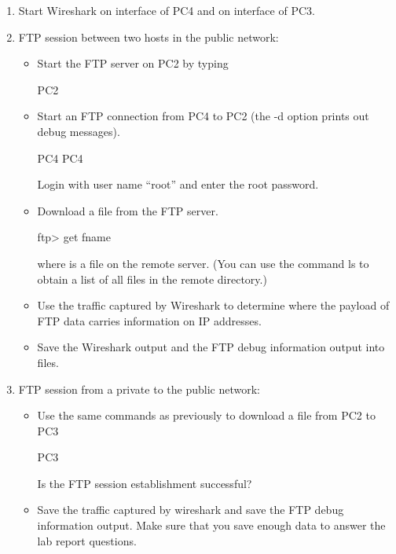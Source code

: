 \begin{enumerate}
	\item Start Wireshark on interface  of PC4 and on interface  of PC3.
	\item FTP session between two hosts in the public network:
		\begin {itemize}
			\item Start the FTP server on PC2 by typing
				\begin{cmdblock}
	PC2%
				\end{cmdblock}
			\item Start an FTP connection from PC4 to PC2 (the -d option prints out debug messages).
				\begin{cmdblock}
	PC4%
	PC4%
				\end{cmdblock}
				Login with user name ``root'' and enter the root password.
			\item Download a file from the FTP server.
				\begin{cmdblock}
	ftp> get fname
				\end{cmdblock}
				where  is a file on the remote server. (You can use the command ls to obtain a list of all files in the remote directory.)
			\item Use the traffic captured by Wireshark to determine where the payload of FTP data carries information on IP addresses.
			\item Save the Wireshark output and the FTP debug information output into files.
		\end{itemize}
	\item FTP session from a private to the public network:
		\begin{itemize}
			\item Use the same commands as previously to download a file from PC2 to PC3
				\begin{cmdblock}
	PC3%
				\end{cmdblock}
				Is the FTP session establishment successful?
			\item Save the traffic captured by wireshark and save the FTP debug information output. Make sure that you save enough data to answer the lab report questions.
		\end{itemize}
\end{enumerate}

\begin{questions}
\end{questions}

